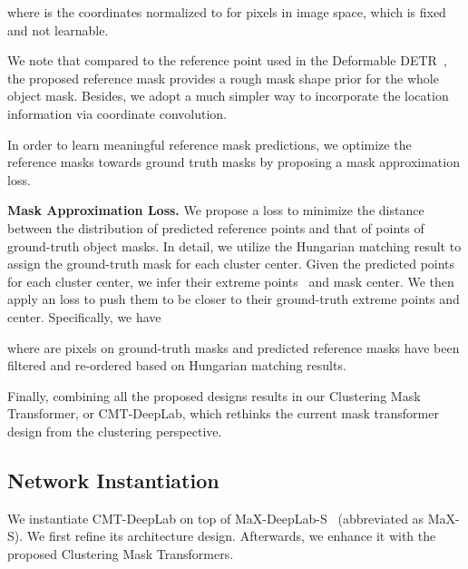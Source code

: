 \documentclass[10pt,twocolumn,letterpaper]{article}
\begin{document}
where  is the coordinates normalized to  for pixels in image space, which is fixed and not learnable.

We note that compared to the reference point used in the Deformable DETR~\cite{zhu2020deformable}, the proposed reference mask provides a rough mask shape prior for the whole object mask. Besides, we adopt a much simpler way to incorporate the location information via coordinate convolution.

In order to learn meaningful reference mask predictions, we optimize the reference masks towards ground truth masks by proposing a mask approximation loss.

\vspace{0.5ex}
\noindent\textbf{Mask Approximation Loss.} We propose a loss to minimize the distance between the distribution of predicted reference points and that of points of ground-truth object masks. In detail, we utilize the Hungarian matching result to assign the ground-truth mask for each cluster center. Given the predicted  points for each cluster center, we infer their extreme points~\cite{papadopoulos2017extreme} and mask center. We then apply an  loss to push them to be closer to their ground-truth extreme points and center. Specifically, we have

{\footnotesize

}where  are pixels on ground-truth masks and predicted reference masks have been filtered and re-ordered based on Hungarian matching results.

Finally, combining all the proposed designs results in our Clustering Mask Transformer, or CMT-DeepLab, which rethinks the current mask transformer design from the clustering perspective.

\subsection{Network Instantiation}
We instantiate CMT-DeepLab on top of MaX-DeepLab-S~\cite{wang2021max} (abbreviated as MaX-S). We first refine its architecture design. Afterwards, we enhance it with the proposed Clustering Mask Transformers.
\end{document}
